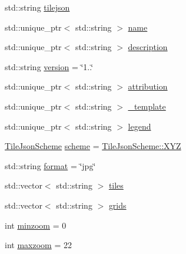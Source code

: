 \begin{DoxyCompactItemize}
\item 
std\+::string \hyperlink{structdg_1_1deepcore_1_1imagery_1_1_tile_json_a6eaf5b206fdf010f6c4b089d9f1dbe32}{tilejson}
\item 
std\+::unique\+\_\+ptr$<$ std\+::string $>$ \hyperlink{structdg_1_1deepcore_1_1imagery_1_1_tile_json_a5e1cb3591fa0d3c15184869d90bf42f9}{name}
\item 
std\+::unique\+\_\+ptr$<$ std\+::string $>$ \hyperlink{structdg_1_1deepcore_1_1imagery_1_1_tile_json_ac2dd8a58ac978ddb8c01fbd5c7fa4820}{description}
\item 
std\+::string \hyperlink{structdg_1_1deepcore_1_1imagery_1_1_tile_json_a3037558f224105b744a9a2c43fdb7b5e}{version} = \char`\"{}1..\char`\"{}
\item 
std\+::unique\+\_\+ptr$<$ std\+::string $>$ \hyperlink{structdg_1_1deepcore_1_1imagery_1_1_tile_json_aaa14afeb610f9e02b8ffb7e6641160d6}{attribution}
\item 
std\+::unique\+\_\+ptr$<$ std\+::string $>$ \hyperlink{structdg_1_1deepcore_1_1imagery_1_1_tile_json_aed003e5b44a92c2dcaf84a71fa19acd0}{\+\_\+template}
\item 
std\+::unique\+\_\+ptr$<$ std\+::string $>$ \hyperlink{structdg_1_1deepcore_1_1imagery_1_1_tile_json_a6c3f9e95dcca896f30244d71b4a93be1}{legend}
\item 
\hyperlink{namespacedg_1_1deepcore_1_1imagery_a69877eb3a0e61e72802663a976413267}{Tile\+Json\+Scheme} \hyperlink{structdg_1_1deepcore_1_1imagery_1_1_tile_json_aa2b4d8a34030e5244783bac674fd6b8c}{scheme} = \hyperlink{namespacedg_1_1deepcore_1_1imagery_a69877eb3a0e61e72802663a976413267ae65075d550f9b5bf9992fa1d71a131be}{Tile\+Json\+Scheme\+::\+X\+YZ}
\item 
std\+::string \hyperlink{structdg_1_1deepcore_1_1imagery_1_1_tile_json_a0ac858ae62a9b9243e8bd8c31a86af7b}{format} = \char`\"{}jpg\char`\"{}
\item 
std\+::vector$<$ std\+::string $>$ \hyperlink{structdg_1_1deepcore_1_1imagery_1_1_tile_json_a586d9458169760019abd61b1651c5112}{tiles}
\item 
std\+::vector$<$ std\+::string $>$ \hyperlink{structdg_1_1deepcore_1_1imagery_1_1_tile_json_a0155f9490e2a1db7894307c860bb5f93}{grids}
\item 
int \hyperlink{structdg_1_1deepcore_1_1imagery_1_1_tile_json_a77756c09c221095697741311a6a6ee50}{minzoom} = 0
\item 
int \hyperlink{structdg_1_1deepcore_1_1imagery_1_1_tile_json_a8f32c4c1ca4750f301ed39ce8d3c19f5}{maxzoom} = 22

\end{DoxyCompactItemize}
